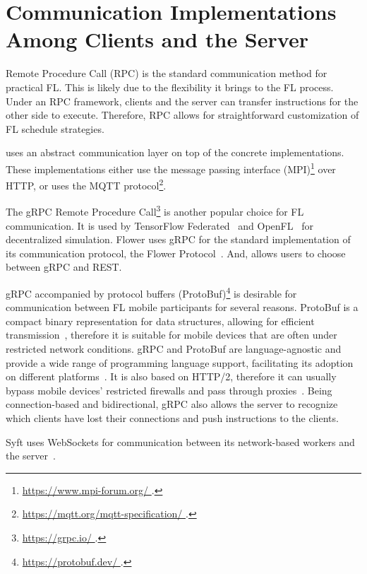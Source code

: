 \documentclass[conference]{IEEEtran}
\begin{document}
\section{Communication Implementations Among Clients and the Server}

\label{sec:communication}

Remote Procedure Call (RPC) is the standard communication method for
practical FL.
This is likely due to the flexibility it brings to the FL process.
Under an RPC framework,
clients and the server can transfer instructions for the other side to execute.
Therefore, RPC allows for straightforward customization of
FL schedule strategies.

\FedML{} uses an abstract communication layer on top of
the concrete implementations.
These implementations either use the message passing interface
(MPI)\footnote{\url{
    https://www.mpi-forum.org/
}.} over HTTP,
or uses the MQTT protocol\footnote{\url{
    https://mqtt.org/mqtt-specification/
}.}.

The gRPC Remote Procedure Call\footnote{\url{
    https://grpc.io/
}.} is another popular choice for FL communication.
It is used by TensorFlow Federated~\cite{tff} and
OpenFL~\cite{patrick2022openfl} for decentralized simulation.
Flower uses gRPC for the standard implementation of
its communication protocol, the Flower Protocol~\cite{beutel2020flower}.
And, \Florida{} allows users to choose between gRPC and REST.

gRPC accompanied by protocol buffers (ProtoBuf)\footnote{\url{
    https://protobuf.dev/
}.} is desirable for communication between FL mobile participants for
several reasons.
ProtoBuf is a compact binary representation for data structures,
allowing for efficient transmission~\cite{popic2016performance},
therefore it is suitable for mobile devices that
are often under restricted network conditions.
gRPC and ProtoBuf are language-agnostic and
provide a wide range of programming language support,
facilitating its adoption on different platforms~\cite{araujo2020performance}.
It is also based on HTTP/2,
therefore it can usually bypass mobile devices' restricted firewalls and
pass through proxies~\cite{araujo2020performance}.
Being connection-based and bidirectional,
gRPC also allows the server to recognize
which clients have lost their connections and
push instructions to the clients.

Syft uses WebSockets for communication between its network-based workers and
the server~\cite{Ziller2021}.
\end{document}
